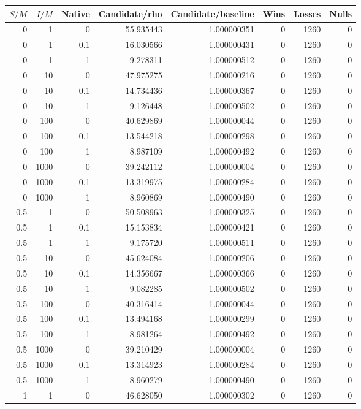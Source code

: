 \documentclass[10pt]{article}
\begin{document}
\small\begin{longtable}{rrrrrrrr}\toprule $S/M$ & $I/M$ & Native & Candidate/rho & Candidate/baseline & Wins & Losses & Nulls \\ \midrule\endhead
0 & 1 & 0 & 55.935443 & 1.000000351 & 0 & 1260 & 0 \\
0 & 1 & 0.1 & 16.030566 & 1.000000431 & 0 & 1260 & 0 \\
0 & 1 & 1 & 9.278311 & 1.000000512 & 0 & 1260 & 0 \\
0 & 10 & 0 & 47.975275 & 1.000000216 & 0 & 1260 & 0 \\
0 & 10 & 0.1 & 14.734436 & 1.000000367 & 0 & 1260 & 0 \\
0 & 10 & 1 & 9.126448 & 1.000000502 & 0 & 1260 & 0 \\
0 & 100 & 0 & 40.629869 & 1.000000044 & 0 & 1260 & 0 \\
0 & 100 & 0.1 & 13.544218 & 1.000000298 & 0 & 1260 & 0 \\
0 & 100 & 1 & 8.987109 & 1.000000492 & 0 & 1260 & 0 \\
0 & 1000 & 0 & 39.242112 & 1.000000004 & 0 & 1260 & 0 \\
0 & 1000 & 0.1 & 13.319975 & 1.000000284 & 0 & 1260 & 0 \\
0 & 1000 & 1 & 8.960869 & 1.000000490 & 0 & 1260 & 0 \\
0.5 & 1 & 0 & 50.508963 & 1.000000325 & 0 & 1260 & 0 \\
0.5 & 1 & 0.1 & 15.153834 & 1.000000421 & 0 & 1260 & 0 \\
0.5 & 1 & 1 & 9.175720 & 1.000000511 & 0 & 1260 & 0 \\
0.5 & 10 & 0 & 45.624084 & 1.000000206 & 0 & 1260 & 0 \\
0.5 & 10 & 0.1 & 14.356667 & 1.000000366 & 0 & 1260 & 0 \\
0.5 & 10 & 1 & 9.082285 & 1.000000502 & 0 & 1260 & 0 \\
0.5 & 100 & 0 & 40.316414 & 1.000000044 & 0 & 1260 & 0 \\
0.5 & 100 & 0.1 & 13.494168 & 1.000000299 & 0 & 1260 & 0 \\
0.5 & 100 & 1 & 8.981264 & 1.000000492 & 0 & 1260 & 0 \\
0.5 & 1000 & 0 & 39.210429 & 1.000000004 & 0 & 1260 & 0 \\
0.5 & 1000 & 0.1 & 13.314923 & 1.000000284 & 0 & 1260 & 0 \\
0.5 & 1000 & 1 & 8.960279 & 1.000000490 & 0 & 1260 & 0 \\
1 & 1 & 0 & 46.628050 & 1.000000302 & 0 & 1260 & 0 \\

\end{longtable}
\end{document}
